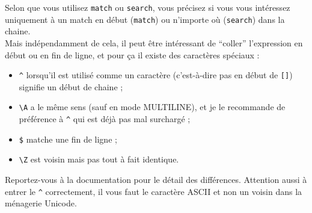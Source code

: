     Selon que vous utilisez \texttt{match} ou \texttt{search}, vous précisez
si vous vous intéressez uniquement à un match en début (\texttt{match})
ou n'importe où (\texttt{search}) dans la chaine.\\

Mais indépendamment de cela, il peut être intéressant de ``coller''
l'expression en début ou en fin de ligne, et pour ça il existe des
caractères spéciaux :

\begin{itemize}
	\item 
	\texttt{\^{}} lorsqu'il est utilisé comme un
	caractère (c'est-à-dire pas en début de \texttt{{[}{]}}) signifie un
	début de chaine ;
	\item
	\texttt{\textbackslash{}A} a le même sens (sauf en
	mode MULTILINE), et je le recommande de préférence à \texttt{\^{}} qui
	est déjà pas mal surchargé ;
	\item
	\texttt{\$} matche une fin de ligne ;
	\item
	\texttt{\textbackslash{}Z} est voisin mais pas tout à fait identique.
\end{itemize}

Reportez-vous à la documentation pour le détail des différences.
Attention aussi à entrer le \texttt{\^{}} correctement, il vous faut le
caractère ASCII et non un voisin dans la ménagerie Unicode.

